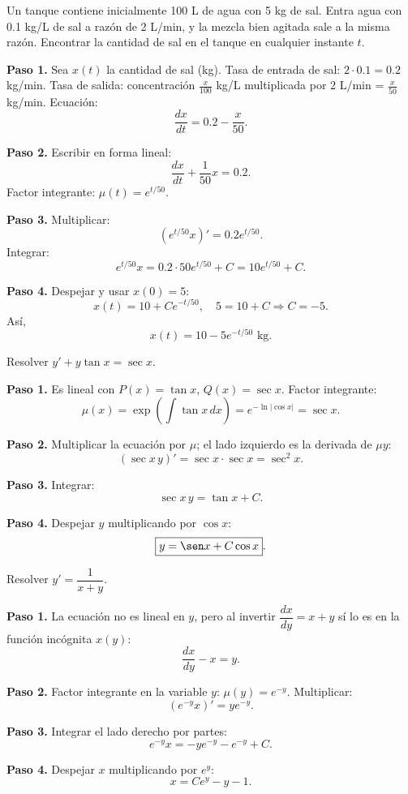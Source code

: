 \begin{example}
Un tanque contiene inicialmente 100 L de agua con 5 kg de sal. Entra agua con 0.1 kg/L de sal a razón de 2 L/min, y la mezcla bien agitada sale a la misma razón. Encontrar la cantidad de sal en el tanque en cualquier instante \(t\).

\begin{myproof}
\textbf{Paso 1.} Sea \(x(t)\) la cantidad de sal (kg). Tasa de entrada de sal: \(2 \cdot 0.1 = 0.2\) kg/min. Tasa de salida: concentración \(\frac{x}{100}\) kg/L multiplicada por 2 L/min = \(\frac{x}{50}\) kg/min.
Ecuación:
\[
\frac{dx}{dt} = 0.2 - \frac{x}{50}.
\]

\textbf{Paso 2.} Escribir en forma lineal:
\[
\frac{dx}{dt} + \frac{1}{50}x = 0.2.
\]
Factor integrante: \(\mu(t)=e^{t/50}\).

\textbf{Paso 3.} Multiplicar:
\[
(e^{t/50} x)' = 0.2 e^{t/50}.
\]
Integrar:
\[
e^{t/50} x = 0.2\cdot 50 e^{t/50} + C = 10 e^{t/50} + C.
\]

\textbf{Paso 4.} Despejar y usar \(x(0)=5\):
\[
x(t) = 10 + C e^{-t/50}, \quad 5 = 10 + C \Rightarrow C = -5.
\]
Así,
\[
\boxed{x(t) = 10 - 5 e^{-t/50} \text{ kg}}.
\]
\end{myproof}
\end{example}

\begin{example}
Resolver $y'+y\tan x=\sec x$.

\begin{myproof}
\textbf{Paso 1.} Es lineal con $P(x)=\tan x$, $Q(x)=\sec x$. Factor integrante:
\[
\mu(x)=\exp\left(\int\tan x\,dx\right)=e^{-\ln|\cos x|}=\sec x.
\]

\textbf{Paso 2.} Multiplicar la ecuación por $\mu$; el lado izquierdo es la derivada de $\mu y$:
\[
(\sec x\,y)'=\sec x\cdot\sec x=\sec^2 x.
\]

\textbf{Paso 3.} Integrar:
\[
\sec x\,y=\tan x+C.
\]

\textbf{Paso 4.} Despejar $y$ multiplicando por $\cos x$:
\[
\boxed{y=\sen x+C\cos x}.
\]
\end{myproof}
\end{example}

\begin{example}
Resolver $y'=\dfrac{1}{x+y}$.

\begin{myproof}
\textbf{Paso 1.} La ecuación no es lineal en $y$, pero al invertir $\dfrac{dx}{dy}=x+y$ sí lo es en la función incógnita $x(y)$:
\[
\frac{dx}{dy}-x=y.
\]

\textbf{Paso 2.} Factor integrante en la variable $y$: $\mu(y)=e^{-y}$. Multiplicar:
\[
(e^{-y}x)'=y e^{-y}.
\]

\textbf{Paso 3.} Integrar el lado derecho por partes:
\[
e^{-y}x=-y e^{-y}-e^{-y}+C.
\]

\textbf{Paso 4.} Despejar $x$ multiplicando por $e^{y}$:
\[
\boxed{x=Ce^{y}-y-1}.
\]
\end{myproof}
\end{example}

